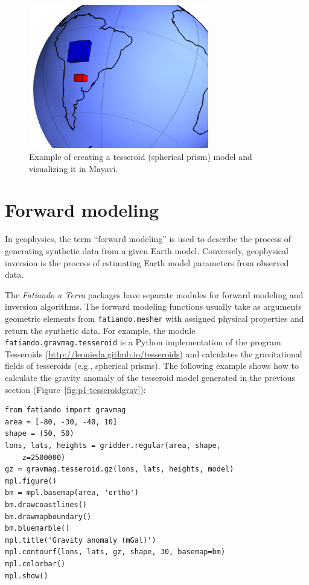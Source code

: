 \begin{figure}
    \centering
    \includegraphics[width=0.7\textwidth]{figures/paper-fatiando/meshes_3dplotting_tesseroid}
    \caption{
        Example of creating a tesseroid (spherical prism) model and visualizing
        it in Mayavi.
    }
    \label{fig:p1-tesseroid}
\end{figure}




\section{Forward modeling}

In geophysics, the term ``forward modeling'' is used to describe the
process of generating synthetic data from a given Earth model.
Conversely, geophysical inversion is the process of estimating Earth
model parameters from observed data.

The \textit{Fatiando a Terra} packages have separate modules for forward modeling
and inversion algorithms. The forward modeling functions usually take as
arguments geometric elements from \texttt{fatiando.mesher} with assigned
physical properties and return the synthetic data. For example, the
module \texttt{fatiando.gravmag.tesseroid} is a Python implementation of
the program Tesseroids (\url{http://leouieda.github.io/tesseroids}) and
calculates the gravitational fields of tesseroids (e.g., spherical
prisms). The following example shows how to calculate the gravity
anomaly of the tesseroid model generated in the previous section
(Figure~\ref{fig:p1-tesseroidgrav}):

\begin{verbatim}
from fatiando import gravmag
area = [-80, -30, -40, 10]
shape = (50, 50)
lons, lats, heights = gridder.regular(area, shape,
    z=2500000)
gz = gravmag.tesseroid.gz(lons, lats, heights, model)
mpl.figure()
bm = mpl.basemap(area, 'ortho')
bm.drawcoastlines()
bm.drawmapboundary()
bm.bluemarble()
mpl.title('Gravity anomaly (mGal)')
mpl.contourf(lons, lats, gz, shape, 30, basemap=bm)
mpl.colorbar()
mpl.show()
\end{verbatim}

